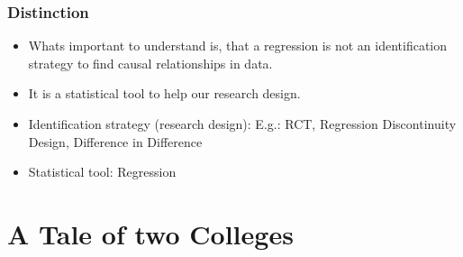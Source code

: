 \documentclass{beamer}
\begin{document}
\begin{frame}
\frametitle{Distinction}
\begin{itemize}
	\item Whats important to understand is, that a regression is not an identification strategy to find causal relationships in data.
	\item It is a statistical tool to help our research design.
	\item Identification strategy (research design): E.g.: RCT, Regression Discontinuity Design, Difference in Difference
	\item Statistical tool: Regression
\end{itemize}
\end{frame}
\section{A Tale of two Colleges} %


\end{document}
